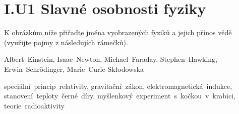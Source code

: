 \documentclass{../../../../style/mkimain}
\begin{document}
\section*{I.U1 Slavné osobnosti fyziky}
\noindent K obrázkům níže přiřaďte jména vyobrazených fyziků a jejich přínos vědě (využijte pojmy z následujích rámečků).
\\
\begin{mdframed}[frametitle={Jména}, frametitlealignment=\center, innerbottommargin=5px]
    \begin{center}
        Albert~Einstein, Isaac~Newton, Michael~Faraday, Stephen~Hawking, Erwin~Schrödinger, Marie~Curie-Skłodowska
    \end{center}
\end{mdframed}
\vspace{0.5cm}
\begin{mdframed}[frametitle={Díla}, frametitlealignment=\center, innerbottommargin=5px]
    \begin{center}
        speciální~princip~relativity, gravitační~zákon, elektromagnetická~indukce, stanovení~teploty~černé~díry, myšlenkový~experiment~s~kočkou~v~krabici, teorie~radioaktivity
    \end{center}
\end{mdframed}
\vspace{0.5cm}
\end{document}
